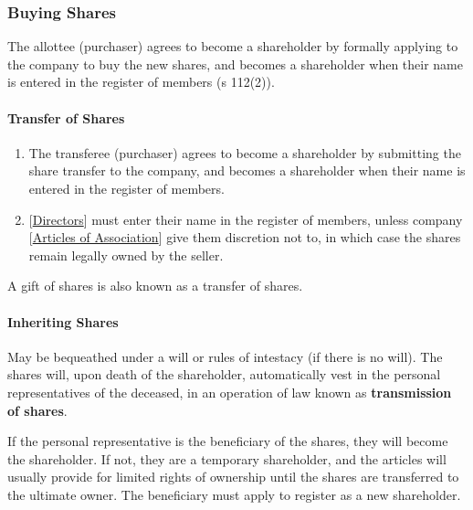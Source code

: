 \documentclass[
]{article}
\providecommand{\tightlist}{%
  \setlength{\itemsep}{0pt}\setlength{\parskip}{0pt}}
\begin{document}
\hypertarget{buying-shares}{%
\subsubsection{Buying Shares}\label{buying-shares}}

The allottee (purchaser) agrees to become a shareholder by formally
applying to the company to buy the new shares, and becomes a shareholder
when their name is entered in the register of members (s 112(2)).

\hypertarget{transfer-of-shares}{%
\paragraph{Transfer of Shares}\label{transfer-of-shares}}

\begin{enumerate}
\def\labelenumi{\arabic{enumi}.}
\tightlist
\item
  The transferee (purchaser) agrees to become a shareholder by
  submitting the share transfer to the company, and becomes a
  shareholder when their name is entered in the register of members.
\item
  {[}\protect\hyperlink{directors-1}{Directors}{]} must enter their name
  in the register of members, unless company
  {[}\protect\hyperlink{articles-of-association-1}{Articles of
  Association}{]} give them discretion not to, in which case the shares
  remain legally owned by the seller.
\end{enumerate}

A gift of shares is also known as a transfer of shares.

\hypertarget{inheriting-shares}{%
\paragraph{Inheriting Shares}\label{inheriting-shares}}

May be bequeathed under a will or rules of intestacy (if there is no
will). The shares will, upon death of the shareholder, automatically
vest in the personal representatives of the deceased, in an operation of
law known as \textbf{transmission of shares}.

If the personal representative is the beneficiary of the shares, they
will become the shareholder. If not, they are a temporary shareholder,
and the articles will usually provide for limited rights of ownership
until the shares are transferred to the ultimate owner. The beneficiary
must apply to register as a new shareholder.
\end{document}
